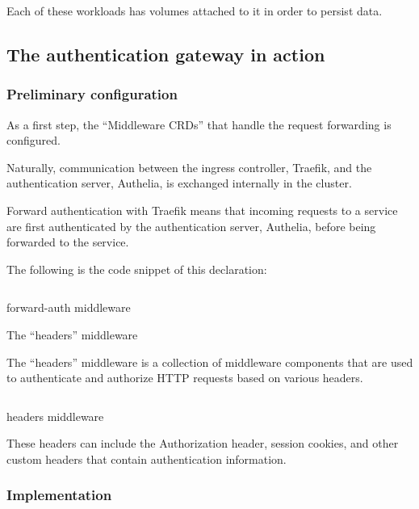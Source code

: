 Each of these workloads has volumes attached to it in order to persist data. 

\subsection{The authentication gateway in action }

\subsubsection{Preliminary configuration }

As a first step, the “Middleware CRDs” that handle the request forwarding is configured. 

Naturally, communication between the ingress controller, Traefik, and the authentication server, Authelia, is exchanged internally in the cluster. 


Forward authentication with Traefik means that incoming requests to a service are first authenticated by the authentication server, Authelia, before being forwarded to the service. 

The following is the code snippet of this declaration: 

\begin{listing}[H]
    \inputminted{Yaml}{codeListing/middleware_forward_auth.yml}
    \caption{forward-auth middleware}
    \label{lst:forward-auth middleware}
\end{listing}

The “headers” middleware 

The “headers” middleware is a collection of middleware components that are used to authenticate and authorize HTTP requests based on various headers.  

\begin{listing}[H]
    \inputminted{Yaml}{codeListing/middleware_headers.yml}
    \caption{headers middleware}
    \label{lst:headers middleware}
\end{listing} 

These headers can include the Authorization header, session cookies, and other custom headers that contain authentication information. 

\subsubsection{Implementation }


